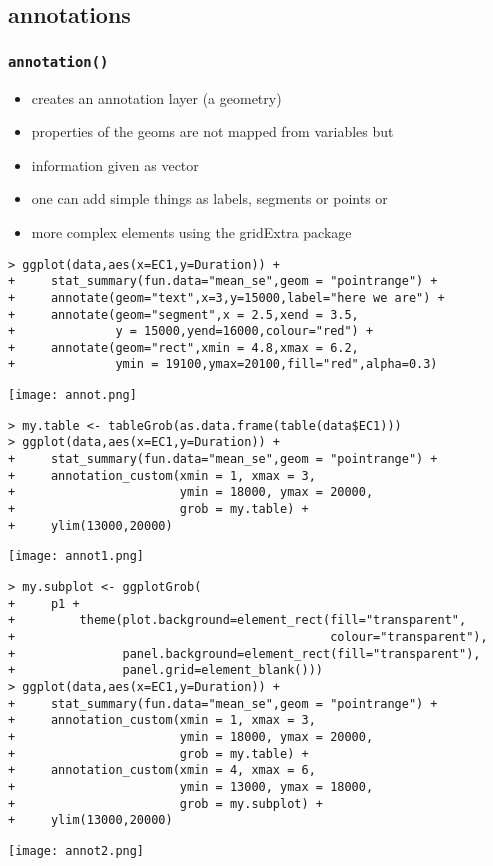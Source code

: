 \subsection{annotations}
\begin{frame}\frametitle{\texttt{annotation()}}
  \begin{itemize}
  \item creates an annotation layer (a geometry)
  \item properties of the geoms are not mapped from variables but
  \item information given as vector
  \item one can add simple things as labels, segments or points or
  \item more complex elements using the gridExtra package
  \end{itemize}\tiny
\begin{verbatim}
> ggplot(data,aes(x=EC1,y=Duration)) +
+     stat_summary(fun.data="mean_se",geom = "pointrange") +
+     annotate(geom="text",x=3,y=15000,label="here we are") +
+     annotate(geom="segment",x = 2.5,xend = 3.5, 
+              y = 15000,yend=16000,colour="red") +
+     annotate(geom="rect",xmin = 4.8,xmax = 6.2, 
+              ymin = 19100,ymax=20100,fill="red",alpha=0.3)
\end{verbatim}
\begin{center}
  \texttt{[image: annot.png]}
\end{center}
\begin{verbatim}
> my.table <- tableGrob(as.data.frame(table(data$EC1)))
> ggplot(data,aes(x=EC1,y=Duration)) +
+     stat_summary(fun.data="mean_se",geom = "pointrange") +
+     annotation_custom(xmin = 1, xmax = 3, 
+                       ymin = 18000, ymax = 20000,
+                       grob = my.table) +
+     ylim(13000,20000)  
\end{verbatim}
\begin{center}
  \texttt{[image: annot1.png]}
\end{center}
\begin{verbatim}
> my.subplot <- ggplotGrob(
+     p1 +
+         theme(plot.background=element_rect(fill="transparent",
+                                            colour="transparent"),
+               panel.background=element_rect(fill="transparent"),
+               panel.grid=element_blank()))
> ggplot(data,aes(x=EC1,y=Duration)) +
+     stat_summary(fun.data="mean_se",geom = "pointrange") +
+     annotation_custom(xmin = 1, xmax = 3, 
+                       ymin = 18000, ymax = 20000,
+                       grob = my.table) +
+     annotation_custom(xmin = 4, xmax = 6, 
+                       ymin = 13000, ymax = 18000,
+                       grob = my.subplot) +
+     ylim(13000,20000)  
\end{verbatim}
\begin{center}
  \texttt{[image: annot2.png]}
\end{center}
\end{frame}

